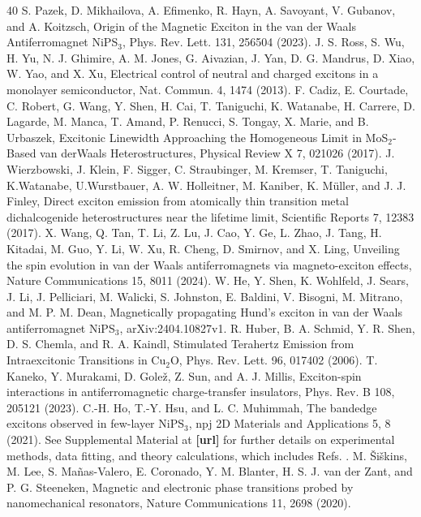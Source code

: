 \documentclass[%
 reprint,
superscriptaddress,
 amsmath,amssymb,
 aps,
]{revtex4-2}
\begin{document}
\begin{thebibliography}{40}
S. Pazek, D. Mikhailova, A. Efimenko, R. Hayn,
A. Savoyant, V. Gubanov, and A. Koitzsch, Origin of the
Magnetic Exciton in the van der Waals Antiferromagnet
NiPS$_3$, Phys. Rev. Lett. 131, 256504 (2023).
J. S. Ross, S. Wu, H. Yu, N. J. Ghimire, A. M. Jones,
G. Aivazian, J. Yan, D. G. Mandrus, D. Xiao, W. Yao,
and X. Xu, Electrical control of neutral and charged excitons
in a monolayer semiconductor, Nat. Commun. 4,
1474 (2013).
F. Cadiz, E. Courtade, C. Robert, G. Wang, Y. Shen,
H. Cai, T. Taniguchi, K. Watanabe, H. Carrere, D. Lagarde,
M. Manca, T. Amand, P. Renucci, S. Tongay,
X. Marie, and B. Urbaszek, Excitonic Linewidth Approaching
the Homogeneous Limit in MoS$_2$-Based van
derWaals Heterostructures, Physical Review X 7, 021026
(2017).
J. Wierzbowski, J. Klein, F. Sigger, C. Straubinger,
M. Kremser, T. Taniguchi, K.Watanabe, U.Wurstbauer,
A. W. Holleitner, M. Kaniber, K. M\"{u}ller, and J. J. Finley,
Direct exciton emission from atomically thin transition
metal dichalcogenide heterostructures near the lifetime
limit, Scientific Reports 7, 12383 (2017).
X. Wang, Q. Tan, T. Li, Z. Lu, J. Cao, Y. Ge, L. Zhao, J. Tang, H. Kitadai, M. Guo, Y. Li, W. Xu, R. Cheng, D. Smirnov, and X. Ling, Unveiling the spin evolution in van der Waals antiferromagnets via magneto-exciton effects, 
Nature Communications 15, 8011 (2024).
W. He, Y. Shen, K. Wohlfeld, J. Sears, J. Li, J. Pelliciari,
M. Walicki, S. Johnston, E. Baldini, V. Bisogni,
M. Mitrano, and M. P. M. Dean, Magnetically propagating
Hund’s exciton in van der Waals antiferromagnet
NiPS$_3$, arXiv:2404.10827v1.
R. Huber, B. A. Schmid, Y. R. Shen, D. S. Chemla, and
R. A. Kaindl, Stimulated Terahertz Emission from Intraexcitonic
Transitions in Cu$_2$O, Phys. Rev. Lett. 96,
017402 (2006).
T. Kaneko, Y. Murakami, D. Gole\v{z}, Z. Sun, and A. J.
Millis, Exciton-spin interactions in antiferromagnetic
charge-transfer insulators, Phys. Rev. B 108, 205121
(2023).
C.-H. Ho, T.-Y. Hsu, and L. C. Muhimmah, The bandedge
excitons observed in few-layer NiPS$_3$, npj 2D Materials
and Applications 5, 8 (2021).
See Supplemental Material at \textbf{[url]} for further details on experimental methods, data fitting, and theory calculations, which includes Refs. \cite{Siskins2022, Fausti2011, Guenther2018, Verdeyen1995, Wildes2022}.
M. \v{S}i\v{s}kins, M. Lee, S. Ma\~{n}as-Valero, E. Coronado, Y. M. Blanter, H. S. J. van der Zant, and P. G. Steeneken, Magnetic and electronic phase transitions probed by nanomechanical resonators, Nature Communications 11, 2698 (2020).

\end{thebibliography}
\end{document}
